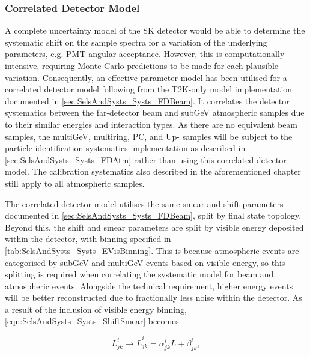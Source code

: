 \subsubsection{Correlated Detector Model}
\label{sec:SelsAndSysts_Systs_Correlated}

A complete uncertainty model of the SK detector would be able to determine the systematic shift on the sample spectra for a variation of the underlying parameters, e.g. PMT angular acceptance. However, this is computationally intensive, requiring Monte Carlo predictions to be made for each plausible variation. Consequently, an effective parameter model has been utilised for a correlated detector model following from the T2K-only model implementation documented in \autoref{sec:SelsAndSysts_Systs_FDBeam}. It correlates the detector systematics between the far-detector beam and subGeV atmospheric samples due to their similar energies and interaction types. As there are no equivalent beam samples, the multiGeV, multiring, PC, and Up-\quickmath{\mu} samples will be subject to the particle identification systematics implementation as described in \autoref{sec:SelsAndSysts_Systs_FDAtm} rather than using this correlated detector model. The calibration systematics also described in the aforementioned chapter still apply to all atmospheric samples.

The correlated detector model utilises the same smear and shift parameters documented in \autoref{sec:SelsAndSysts_Systs_FDBeam}, split by final state topology. Beyond this, the shift and smear parameters are split by visible energy deposited within the detector, with binning specified in \autoref{tab:SelsAndSysts_Systs_EVisBinning}. This is because atmospheric events are categorised by subGeV and multiGeV events based on visible energy, so this splitting is required when correlating the systematic model for beam and atmospheric events. Alongside the technical requirement, higher energy events will be better reconstructed due to fractionally less noise within the detector. As a result of the inclusion of visible energy binning, \autoref{eqn:SelsAndSysts_Systs_ShiftSmear} becomes

\begin{equation}
  \label{eqn:SelsAndSysts_Systs_ShiftSmearWithEVis}
  L^{i}_{jk} \rightarrow \bar{L}^{i}_{jk} = \alpha^{i}_{jk} L + \beta^{i}_{jk},
\end{equation}

